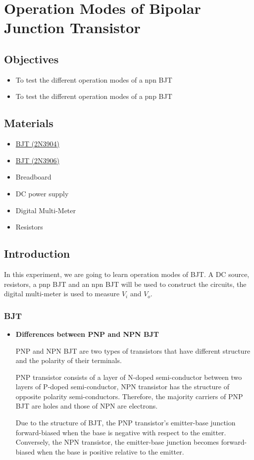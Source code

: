 \chapter{Operation Modes of Bipolar Junction Transistor}


\section{Objectives}
\begin{itemize}
    \item To test the different operation modes of a npn BJT
    \item To test the different operation modes of a pnp BJT
\end{itemize}

\section{Materials}
\begin{itemize}
    \item \hyperref[2N3904_1]{BJT (2N3904)}
    \item \hyperref[2N3906_1]{BJT (2N3906)}
    \item Breadboard
    \item DC power supply
    \item Digital Multi-Meter
    \item Resistors
\end{itemize}

\section{Introduction}
In this experiment, we are going to learn operation modes of BJT. A DC source, resistors, a pnp BJT and an npn BJT will be used to construct the circuits, the digital multi-meter is used to measure $V_i$ and $V_o$.\par
    \subsection{BJT}
    \begin{itemize}
        \item \textbf{Differences between PNP and NPN BJT}\par
            PNP and NPN BJT are two types of transistors that have different structure and the polarity of their terminals.\par
            PNP transistor consists of a layer of N-doped semi-conductor between two layers of P-doped semi-conductor, NPN transistor has the structure of opposite polarity semi-conductors. Therefore, the majority carriers of PNP BJT are holes and those of NPN are electrons.\par
            Due to the structure of BJT, the PNP transistor's emitter-base junction forward-biased when the base is negative with respect to the emitter. Conversely, the NPN transistor, the emitter-base junction becomes forward-biased when the base is positive relative to the emitter.        
    \end{itemize}
    
